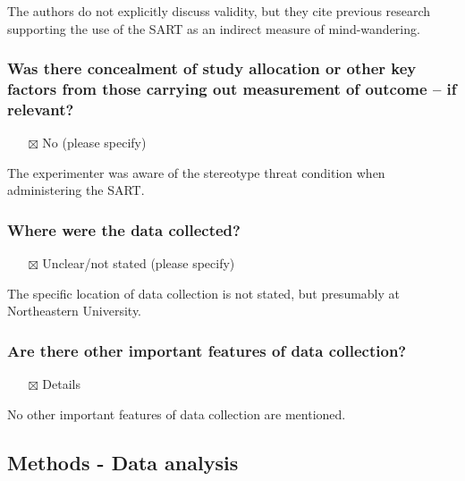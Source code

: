 \documentclass[
  doc, a4paper]{apa7}
\providecommand{\tightlist}{%
  \setlength{\itemsep}{0pt}\setlength{\parskip}{0pt}}
\begin{document}
The authors do not explicitly discuss validity, but they cite previous research supporting the use of the SART as an indirect measure of mind-wandering.

\subsubsection{Was there concealment of study allocation or other key factors from those carrying out measurement of outcome -- if relevant?}\label{was-there-concealment-of-study-allocation-or-other-key-factors-from-those-carrying-out-measurement-of-outcome-if-relevant}

\begin{itemize}
\tightlist
\item[$\boxtimes$]
  No (please specify)
\end{itemize}

The experimenter was aware of the stereotype threat condition when administering the SART.

\subsubsection{Where were the data collected?}\label{where-were-the-data-collected}

\begin{itemize}
\tightlist
\item[$\boxtimes$]
  Unclear/not stated (please specify)
\end{itemize}

The specific location of data collection is not stated, but presumably at Northeastern University.

\subsubsection{Are there other important features of data collection?}\label{are-there-other-important-features-of-data-collection}

\begin{itemize}
\tightlist
\item[$\boxtimes$]
  Details
\end{itemize}

No other important features of data collection are mentioned.

\subsection{Methods - Data analysis}\label{methods---data-analysis}
\end{document}
